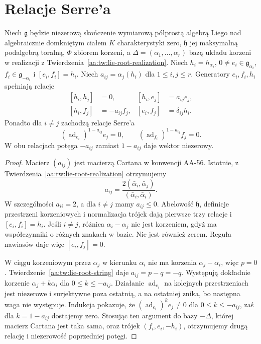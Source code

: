 \section{Relacje Serre'a}

\begin{twierdzenie}
\label{aa:tw:lie-serre-necessary}
Niech $\mathfrak g$ będzie niezerową skończenie wymiarową półprostą algebrą Liego nad algebraicznie domkniętym ciałem $K$ charakterystyki zero, $\mathfrak h$ jej maksymalną podalgebrą toralną, $\Phi$ zbiorem korzeni, a $\Delta=(\alpha_1,\ldots,\alpha_r)$ bazą układu korzeni w realizacji z Twierdzenia~\ref{aa:tw:lie-root-realization}. Niech $h_i=h_{\alpha_i}$, $0\ne e_i\in\mathfrak g_{\alpha_i}$, $f_i\in\mathfrak g_{-\alpha_i}$ i $[e_i,f_i]=h_i$. Niech $a_{ij}=\alpha_j(h_i)$ dla $1\le i,j\le r$. Generatory $e_i,f_i,h_i$ spełniają relacje
\[
\begin{aligned}
 [h_i,h_j]&=0, &
 [h_i,e_j]&=a_{ij}e_j,\\
 [h_i,f_j]&=-a_{ij}f_j, &
 [e_i,f_j]&=\delta_{ij}h_i.
\end{aligned}
\]
Ponadto dla $i\ne j$ zachodzą relacje Serre'a
\[
 (\operatorname{ad}_{e_i})^{1-a_{ij}}e_j=0,\qquad
 (\operatorname{ad}_{f_i})^{1-a_{ij}}f_j=0.
\]
W obu relacjach potęga $-a_{ij}$ zamiast $1-a_{ij}$ daje wektor niezerowy.
\end{twierdzenie}
\begin{proof}
Macierz $(a_{ij})$ jest macierzą Cartana w konwencji AA-56. Istotnie, z Twierdzenia~\ref{aa:tw:lie-root-realization} otrzymujemy
\[
 a_{ij}=\frac{2(\bar\alpha_i,\bar\alpha_j)}{(\bar\alpha_i,\bar\alpha_i)}.
\] W szczególności $a_{ii}=2$, a dla $i\ne j$ mamy $a_{ij}\le0$. Abelowość $\mathfrak h$, definicje przestrzeni korzeniowych i normalizacja trójek dają pierwsze trzy relacje i $[e_i,f_i]=h_i$. Jeśli $i\ne j$, różnica $\alpha_i-\alpha_j$ nie jest korzeniem, gdyż ma współczynniki o różnych znakach w bazie. Nie jest również zerem. Reguła nawiasów daje więc $[e_i,f_j]=0$.

W ciągu korzeniowym przez $\alpha_j$ w kierunku $\alpha_i$ nie ma korzenia $\alpha_j-\alpha_i$, więc $p=0$. Twierdzenie~\ref{aa:tw:lie-root-string} daje $a_{ij}=p-q=-q$. Występują dokładnie korzenie $\alpha_j+k\alpha_i$ dla $0\le k\le -a_{ij}$. Działanie $\operatorname{ad}_{e_i}$ na kolejnych przestrzeniach jest niezerowe i surjektywne poza ostatnią, a na ostatniej znika, bo następna waga nie występuje. Indukcja pokazuje, że $(\operatorname{ad}_{e_i})^k e_j\ne0$ dla $0\le k\le -a_{ij}$, zaś dla $k=1-a_{ij}$ dostajemy zero. Stosując ten argument do bazy $-\Delta$, której macierz Cartana jest taka sama, oraz trójek $(f_i,e_i,-h_i)$, otrzymujemy drugą relację i niezerowość poprzedniej potęgi.
\end{proof}

